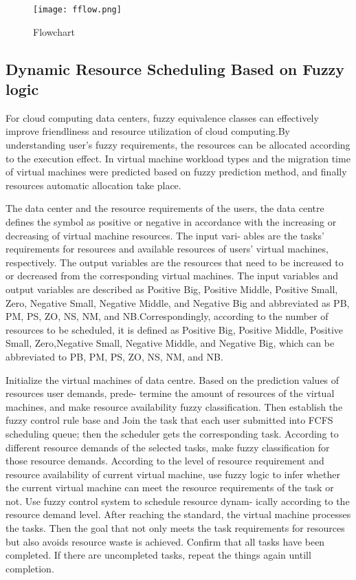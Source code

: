 \documentclass[a4paper,12pt]{report}
\begin{document}
{{{{			\pagebreak
	
		\begin{figure}[h]
			\begin{center}
				\texttt{[image: fflow.png]}\\
			\end{center}
			\caption{ Flowchart}
		\end{figure}
			
		
	\pagebreak
	\subsection{Dynamic Resource Scheduling Based on Fuzzy logic}
	\par For cloud computing data centers, fuzzy equivalence classes can effectively improve friendliness and resource utilization of cloud computing.By understanding user’s
	fuzzy requirements, the resources can be allocated according to the execution effect.
	In virtual machine
	workload types and the migration time of virtual machines
	were predicted based on fuzzy prediction method, and
	finally resources automatic allocation take place.
\par The data center and the resource
requirements of the users, the data centre defines the symbol
as positive or negative in accordance with the increasing
or decreasing of virtual machine resources. The input vari-
ables are the tasks’ requirements for resources and available
resources of users’ virtual machines, respectively. The output
variables are the resources that need to be increased to or
decreased from the corresponding virtual machines.		
The input variables and output variables are
described as Positive Big, Positive Middle, Positive Small,
Zero, Negative Small, Negative Middle, and Negative Big and abbreviated as PB, PM, PS, ZO,
NS, NM, and NB.Correspondingly,
according to the number of resources to be scheduled, it is
defined as Positive Big, Positive Middle, Positive Small, Zero,Negative Small, Negative Middle, and Negative Big, which
can be abbreviated to PB, PM, PS, ZO, NS, NM, and NB.
\par Initialize the virtual machines of data centre. Based
on the prediction values of resources user demands, prede-
termine the amount of resources of the virtual machines, and
make resource availability fuzzy classification.
Then establish the fuzzy control rule base and
 Join the task that each user submitted into FCFS
scheduling queue; then the scheduler gets the corresponding
task.
 According to different resource demands of the
selected tasks, make fuzzy classification for those resource
demands.
 According to the level of resource requirement and
resource availability of current virtual machine, use fuzzy
logic to infer whether the current virtual machine can meet
the resource requirements of the task or not.  Use fuzzy control system to schedule resource dynam-
ically according to the resource demand level. After reaching
the standard, the virtual machine processes the tasks. Then
the goal that not only meets the task requirements for
resources but also avoids resource waste is achieved.
Confirm that all tasks have been completed. If there
are uncompleted tasks, repeat the things again untill completion.	


}}}}
\end{document}
